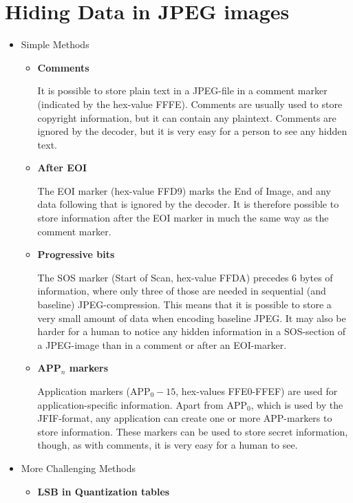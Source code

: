 
\section{Hiding Data in JPEG images}

\begin{itemize}
	\item Simple Methods
	\begin{itemize}
		\item \textbf{Comments}
		
		It is possible to store plain text in a JPEG-file in a comment marker (indicated by the hex-value FFFE).
		Comments are usually used to store copyright information, but it can contain any plaintext.
		Comments are ignored by the decoder, but it is very easy for a person to see any hidden text.

		\item \textbf{After EOI}
		
		The EOI marker (hex-value FFD9) marks the End of Image, and any data following that is ignored by the decoder.
		It is therefore possible to store information after the EOI marker in much the same way as the comment marker.

		\item \textbf{Progressive bits}
		
		The SOS marker (Start of Scan, hex-value FFDA) precedes 6 bytes of information, where only three of those are needed in sequential (and baseline) JPEG-compression.
		This means that it is possible to store a very small amount of data when encoding baseline JPEG.
		It may also be harder for a human to notice any hidden information in a SOS-section of a JPEG-image than in a comment or after an EOI-marker.

		\item \textbf{APP$_n$ markers}
		
		Application markers (APP$_0-15$, hex-values FFE0-FFEF) are used for application-specific information.
		Apart from APP$_0$, which is used by the JFIF-format, any application can create one or more APP-markers to store information.
		These markers can be used to store secret information, though, as with comments, it is very easy for a human to see.
	\end{itemize}
	\item More Challenging Methods
	\begin{itemize}
		\item \textbf{LSB in Quantization tables}


\end{itemize}
\end{itemize}
